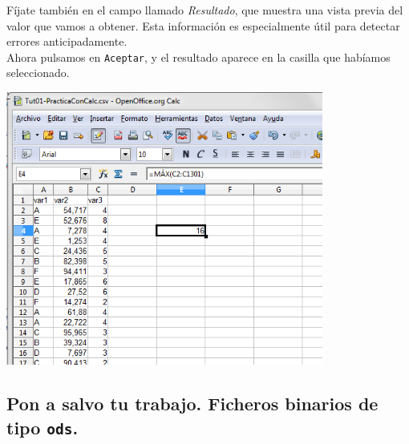 \documentclass[10pt,a4paper]{article}\usepackage[]{graphicx}\usepackage[]{color}
\begin{document}
Fíjate también en el campo llamado {\em Resultado}, que muestra una vista previa del valor que vamos a obtener. Esta información es especialmente útil para detectar errores anticipadamente. \\

Ahora pulsamos en  {\tt Aceptar}, y el resultado aparece en la casilla que habíamos seleccionado.
    \begin{center}
    \includegraphics[height=9cm]{../fig/Tut01-Calc-tablaFrec-06.png}
    \end{center}
\subsection*{Pon a salvo tu trabajo. Ficheros binarios de tipo {\tt ods}.}
\label{tut01:subsec:PonASalvoTuTrabajo}
\end{document}
